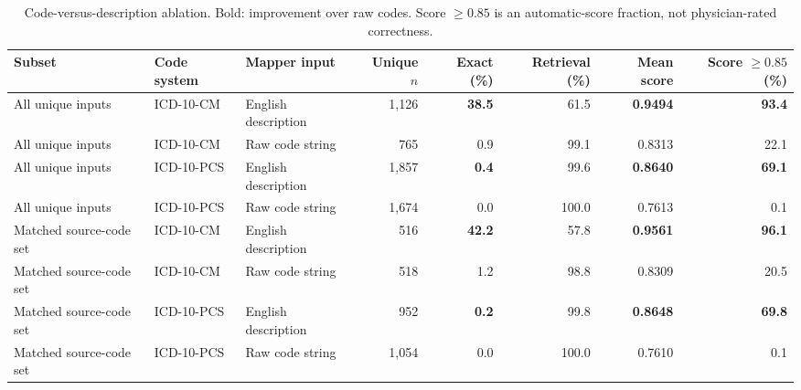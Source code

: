 \begin{table}[!t]
\caption{Code-versus-description ablation. Bold: improvement over raw codes. Score $\geq0.85$ is an automatic-score fraction, not physician-rated correctness.}
\label{tab:icd-input-ablation}
\centering\footnotesize
\setlength{\tabcolsep}{3.0pt}
\begin{tabular}{lllrrrrr}
\toprule
Subset & Code system & Mapper input & Unique $n$ & Exact (\%) & Retrieval (\%) & Mean score & Score $\geq0.85$ (\%) \\
\midrule
All unique inputs & ICD-10-CM & English description & 1,126 & \textbf{38.5} & 61.5 & \textbf{0.9494} & \textbf{93.4} \\
All unique inputs & ICD-10-CM & Raw code string & 765 & 0.9 & 99.1 & 0.8313 & 22.1 \\
All unique inputs & ICD-10-PCS & English description & 1,857 & \textbf{0.4} & 99.6 & \textbf{0.8640} & \textbf{69.1} \\
All unique inputs & ICD-10-PCS & Raw code string & 1,674 & 0.0 & 100.0 & 0.7613 & 0.1 \\
\midrule
Matched source-code set & ICD-10-CM & English description & 516 & \textbf{42.2} & 57.8 & \textbf{0.9561} & \textbf{96.1} \\
Matched source-code set & ICD-10-CM & Raw code string & 518 & 1.2 & 98.8 & 0.8309 & 20.5 \\
Matched source-code set & ICD-10-PCS & English description & 952 & \textbf{0.2} & 99.8 & \textbf{0.8648} & \textbf{69.8} \\
Matched source-code set & ICD-10-PCS & Raw code string & 1,054 & 0.0 & 100.0 & 0.7610 & 0.1 \\
\bottomrule
\end{tabular}
\end{table}
